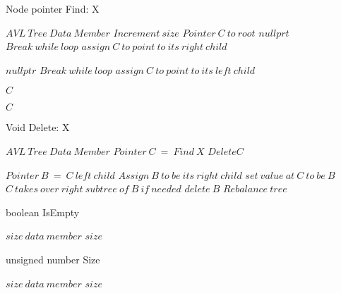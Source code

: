 \documentclass[journal]{IEEEtran}
\begin{document}
\begin{algorithm}
    \caption{Node pointer Find: X}
    \begin{algorithmic}
        \REQUIRE $AVL~Tree~Data~Member$
        \STATE $Increment~size$
        \STATE $Pointer~C~to~root$
        \RETURN $nullprt$
        \STATE $Break~while~loop$
        \ENDIF
        \STATE $assign~C~to~point~to~its~right~child$
        \ENDIF

        \RETURN $nullptr$
        \STATE $Break~while~loop$
        \ENDIF
        \STATE $assign~C~to~point~to~its~left~child$
        \ENDIF

        \RETURN $C$
        \ENDIF

        \ENDWHILE

        \RETURN $C$

    \end{algorithmic}
\end{algorithm}

\begin{algorithm}
    \caption{Void Delete: X}
    \begin{algorithmic}
        \REQUIRE $AVL~Tree~Data~Member$
        \STATE $Pointer~C~=~Find~X$
        \STATE $Delete C$
        \ENDIF


        \STATE $Pointer~B~=~C~left~child$
        \STATE $Assign~B~to~be~its~right~child$
        \ENDWHILE
        \STATE $set~value~at~C~to~be~B$
        \STATE $C~takes~over~right~subtree~of~B~if~needed$
        \STATE $delete~B$
        \STATE $Rebalance~tree$
    \end{algorithmic}

\end{algorithm}

\begin{algorithm}
    \caption{boolean IsEmpty}
    \begin{algorithmic}
        \REQUIRE $size~data~member$
        \RETURN $size$
    \end{algorithmic}
\end{algorithm}

\begin{algorithm}
    \caption{unsigned number Size}
    \begin{algorithmic}
        \REQUIRE $size~data~member$
        \RETURN $size$
    \end{algorithmic}
\end{algorithm}
\end{document}
